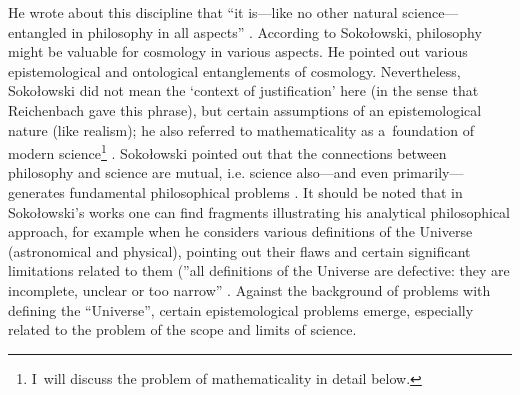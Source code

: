 \documentclass[%
  manuscript=article,
  year=2024,
  volume=77,
  doi=00000.000,
]{zfn}
\begin{document}
He wrote about this discipline that ``it is---like no other natural science---entangled in philosophy in all aspects''
\parencite[][p.226]{Sokoowski2017Kopoty}. %
 According to Sokołowski, philosophy might be valuable for cosmology in various aspects. He pointed out various epistemological and ontological entanglements of cosmology. Nevertheless, Sokołowski did not mean the ‘context of justification' here (in the sense that Reichenbach gave this phrase), but certain assumptions of an epistemological nature (like realism); he also referred to mathematicality as a~foundation of modern science\footnote{I~will discuss the problem of mathematicality in detail below. } 
\parencite[][p.181]{Sokoowski2014Czy}. %
 Sokołowski pointed out that the connections between philosophy and science are mutual, i.e. science also---and even primarily---generates fundamental philosophical problems 
\parencite[][p.56]{Sokoowski2015Granice}. %
 It should be noted that in Sokołowski's works one can find fragments illustrating his analytical philosophical approach, for example when he considers various definitions of the Universe (astronomical and physical), pointing out their flaws and certain significant limitations related to them (''all definitions of the Universe are defective: they are incomplete, unclear or too narrow''
\parencite[][p.235]{Sokoowski2017Kopoty}. %
 Against the background of problems with defining the ``Universe'', certain epistemological problems emerge, especially related to the problem of the scope and limits of science.
\end{document}
